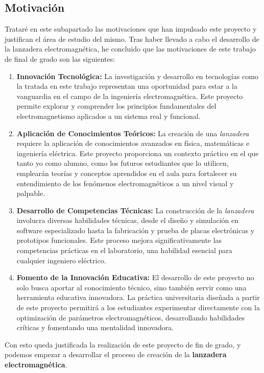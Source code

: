 \subsection{Motivación}

Trataré en este subapartado las motivaciones que han impulsado este proyecto y justifican el área de estudio del mismo. Tras haber llevado a cabo el desarrollo de la lanzadera electromagnética, he concluido que las motivaciones de este trabajo de final de grado son las siguientes: 

\begin{enumerate}
    \item \textbf{Innovación Tecnológica:} La investigación y desarrollo en tecnologías como la tratada en este trabajo representan una oportunidad para estar a la vanguardia en el campo de la ingeniería electromagnética. Este proyecto permite explorar y comprender los principios fundamentales del electromagnetismo aplicados a un sistema real y funcional.
    \item \textbf{Aplicación de Conocimientos Teóricos:} La creación de una \textit{lanzadera} requiere la aplicación de conocimientos avanzados en física, matemáticas e ingeniería eléctrica. Este proyecto proporciona un contexto práctico en el que tanto yo como alumno, como los futuros estudiantes que lo utilicen, emplearán teorías y conceptos aprendidos en el aula para fortalecer su entendimiento de los fenómenos electromagnéticos a un nivel visual y palpable.
    \item \textbf{Desarrollo de Competencias Técnicas:} La construcción de la \textit{lanzadera} involucra diversas habilidades técnicas, desde el diseño y simulación en software especializado hasta la fabricación y prueba de placas electrónicas y prototipos funcionales. Este proceso mejora significativamente las competencias prácticas en el laboratorio, una habilidad esencial para cualquier ingeniero eléctrico.
    \item \textbf{Fomento de la Innovación Educativa:} El desarrollo de este proyecto no solo busca aportar al conocimiento técnico, sino también servir como una herramienta educativa innovadora. La práctica universitaria diseñada a partir de este proyecto permitirá a los estudiantes experimentar directamente con la optimización de parámetros electromagnéticos, desarrollando habilidades críticas y fomentando una mentalidad innovadora.
\end{enumerate}

Con esto queda justificada la realización de este proyecto de fin de grado, y podemos empezar a desarrollar el proceso de creación de la \textbf{lanzadera electromagnética}.

